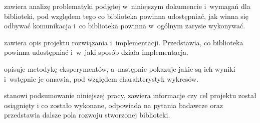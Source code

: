  zawiera analizę problematyki
podjętej w~niniejszym dokumencie i~wymagań dla biblioteki,
pod względem tego co biblioteka powinna udostępniać,
jak winna się odbywać komunikacja
i~co biblioteka powinna w~ogólnym zarysie wykonywać.

 zawiera opis projektu rozwiązania
i~implementacji. Przedstawia, co biblioteka powinna
udostępniać i~w~jaki sposób działa implementacja.

 opisuje metodykę eksperymentów,
a~następnie pokazuje jakie są ich wyniki i~wstępnie
je omawia, pod względem charakterystyk wykresów.

 stanowi podsumowanie niniejszej pracy, zawiera informacje czy cel projektu został osiągnięty i co zostało wykonane, odpowiada na pytania badawcze oraz przedstawia dalsze pola rozwoju stworzonej biblioteki.
